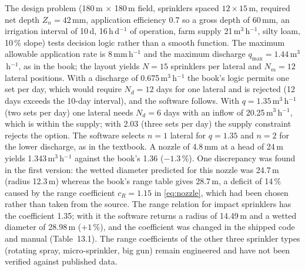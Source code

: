 The design problem (180\,m $\times$ 180\,m field, sprinklers spaced $12\times15$\,m, required net depth $Z_n=42$\,mm, application efficiency 0.7 so a gross depth of 60\,mm, an irrigation interval of 10\,d, 16\,h\,d$^{-1}$ of operation, farm supply 21\,m$^3$\,h$^{-1}$, silty loam, 10\,\% slope) tests decision logic rather than a smooth function. The maximum allowable application rate is 8\,mm\,h$^{-1}$ and the maximum discharge $q_{\max}=1.44$\,m$^3$\,h$^{-1}$, as in the book; the layout yields $N=15$ sprinklers per lateral and $N_m=12$ lateral positions. With a discharge of 0.675\,m$^3$\,h$^{-1}$ the book's logic permits one set per day, which would require $N_d=12$ days for one lateral and is rejected (12 days exceeds the 10-day interval), and the software follows. With $q=1.35$\,m$^3$\,h$^{-1}$ (two sets per day) one lateral needs $N_d=6$ days with an inflow of 20.25\,m$^3$\,h$^{-1}$, which is within the supply; with 2.03 (three sets per day) the supply constraint rejects the option. The software selects $n=1$ lateral for $q=1.35$ and $n=2$ for the lower discharge, as in the textbook. A nozzle of 4.8\,mm at a head of 24\,m yields 1.343\,m$^3$\,h$^{-1}$ against the book's 1.36 ($-1.3$\,\%). One discrepancy was found in the first version: the wetted diameter predicted for this nozzle was 24.7\,m (radius 12.3\,m) whereas the book's range table gives 28.7\,m, a deficit of 14\,\% caused by the range coefficient $c_R=1.15$ in \cref{eq:nozzle}, which had been chosen rather than taken from the source. The \citet{Keller1990} range relation for impact sprinklers has the coefficient 1.35; with it the software returns a radius of 14.49\,m and a wetted diameter of 28.98\,m ($+1$\,\%), and the coefficient was changed in the shipped code and manual (Table~13.1). The range coefficients of the other three sprinkler types (rotating spray, micro-sprinkler, big gun) remain engineered and have not been verified against published data.

